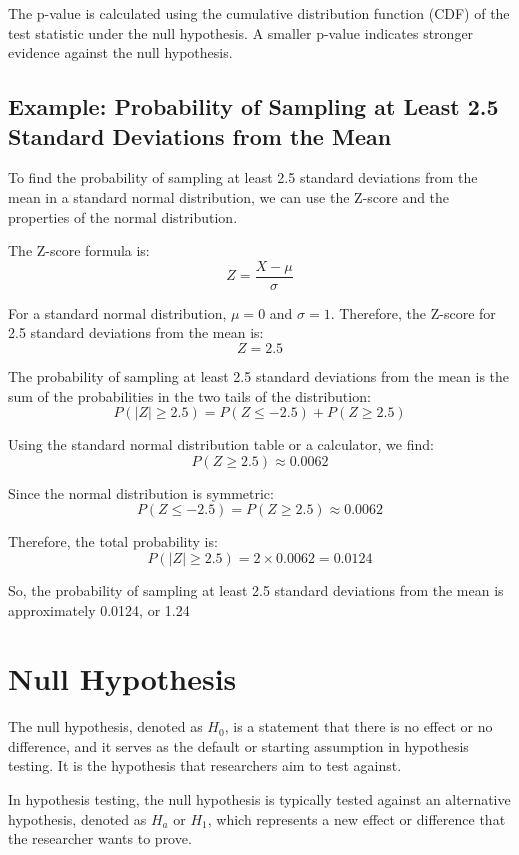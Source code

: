 \documentclass{article}
\begin{document}
The p-value is calculated using the cumulative distribution function (CDF) of the test statistic under the null hypothesis. A smaller p-value indicates stronger evidence against the null hypothesis.

\subsection{Example: Probability of Sampling at Least 2.5 Standard Deviations from the Mean}
To find the probability of sampling at least 2.5 standard deviations from the mean in a standard normal distribution, we can use the Z-score and the properties of the normal distribution.

The Z-score formula is:
\[
Z = \frac{X - \mu}{\sigma}
\]

For a standard normal distribution, \(\mu = 0\) and \(\sigma = 1\). Therefore, the Z-score for 2.5 standard deviations from the mean is:
\[
Z = 2.5
\]

The probability of sampling at least 2.5 standard deviations from the mean is the sum of the probabilities in the two tails of the distribution:
\[
P(|Z| \geq 2.5) = P(Z \leq -2.5) + P(Z \geq 2.5)
\]

Using the standard normal distribution table or a calculator, we find:
\[
P(Z \geq 2.5) \approx 0.0062
\]

Since the normal distribution is symmetric:
\[
P(Z \leq -2.5) = P(Z \geq 2.5) \approx 0.0062
\]

Therefore, the total probability is:
\[
P(|Z| \geq 2.5) = 2 \times 0.0062 = 0.0124
\]

So, the probability of sampling at least 2.5 standard deviations from the mean is approximately 0.0124, or 1.24%

\section{Null Hypothesis}
The null hypothesis, denoted as \(H_0\), is a statement that there is no effect or no difference, and it serves as the default or starting assumption in hypothesis testing. It is the hypothesis that researchers aim to test against.

In hypothesis testing, the null hypothesis is typically tested against an alternative hypothesis, denoted as \(H_a\) or \(H_1\), which represents a new effect or difference that the researcher wants to prove.
\end{document}
